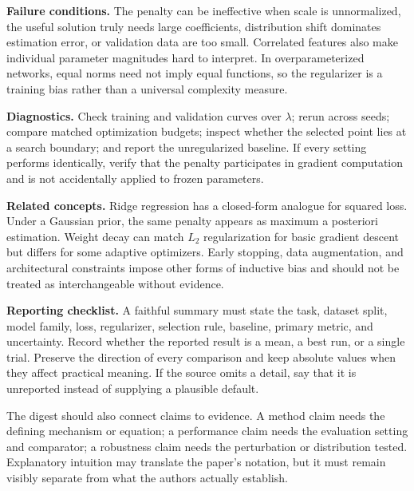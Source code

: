 \documentclass[10pt,letterpaper,twocolumn]{article}
\renewcommand{\section}[1]{\vspace{2pt}\textbf{#1.}\hspace{0.30em}}
\begin{document}
\section{Failure conditions}
The penalty can be ineffective when scale is unnormalized, the useful solution truly needs large coefficients, distribution shift dominates estimation error, or validation data are too small. Correlated features also make individual parameter magnitudes hard to interpret. In overparameterized networks, equal norms need not imply equal functions, so the regularizer is a training bias rather than a universal complexity measure.

\section{Diagnostics}
Check training and validation curves over $\lambda$; rerun across seeds; compare matched optimization budgets; inspect whether the selected point lies at a search boundary; and report the unregularized baseline. If every setting performs identically, verify that the penalty participates in gradient computation and is not accidentally applied to frozen parameters.

\section{Related concepts}
Ridge regression has a closed-form analogue for squared loss. Under a Gaussian prior, the same penalty appears as maximum a posteriori estimation. Weight decay can match $L_2$ regularization for basic gradient descent but differs for some adaptive optimizers. Early stopping, data augmentation, and architectural constraints impose other forms of inductive bias and should not be treated as interchangeable without evidence.

\section{Reporting checklist}
A faithful summary must state the task, dataset split, model family, loss, regularizer, selection rule, baseline, primary metric, and uncertainty. Record whether the reported result is a mean, a best run, or a single trial. Preserve the direction of every comparison and keep absolute values when they affect practical meaning. If the source omits a detail, say that it is unreported instead of supplying a plausible default.

The digest should also connect claims to evidence. A method claim needs the defining mechanism or equation; a performance claim needs the evaluation setting and comparator; a robustness claim needs the perturbation or distribution tested. Explanatory intuition may translate the paper's notation, but it must remain visibly separate from what the authors actually establish.
\end{document}
